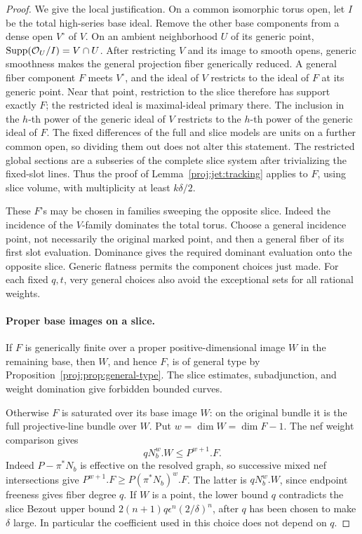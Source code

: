 \begin{proof}
We give the local justification.  On a common isomorphic torus
open, let \(I\) be the total high-series base ideal.  Remove the
other base components from a dense open \(V^\circ\) of \(V\).
On an ambient neighborhood \(U\) of its generic point,
\(\operatorname{Supp}(\mathcal{O}_U/I)=V\cap U\).
After restricting \(V\) and its image to smooth opens, generic
smoothness makes the general projection fiber generically reduced.
A general fiber component \(F\) meets \(V^\circ\), and the ideal
of \(V\) restricts to the ideal of \(F\) at its generic point.
Near that point,
restriction to the slice therefore has support exactly \(F\);
the restricted ideal is maximal-ideal primary there.  The inclusion
in the \(h\)-th power of the generic ideal of \(V\) restricts to
the \(h\)-th power of the generic ideal of \(F\).
The fixed differences of the full and slice models are units on
a further common open, so dividing them out does not alter this
statement.  The restricted global sections are a subseries of
the complete slice system after trivializing the fixed-slot lines.
Thus the proof of Lemma~\ref{proj:jet:tracking} applies to \(F\), using
slice volume, with multiplicity at least \(k\delta/2\).

These \(F\)'s may be chosen in families sweeping the opposite
slice.  Indeed the incidence of the \(V\)-family dominates the
total torus.  Choose a general incidence point, not necessarily
the original marked point, and then a general fiber of its first
slot evaluation.  Dominance gives the required dominant evaluation
onto the opposite slice.  Generic flatness permits the component
choices just made.  For each fixed \(q,t\), very general choices
also avoid the exceptional sets for all rational weights.

\paragraph{Proper base images on a slice.}
If \(F\) is generically finite over a proper positive-dimensional
image \(W\) in the remaining base, then \(W\), and hence \(F\), is
of general type by Proposition~\ref{proj:prop:general-type}.
The slice estimates, subadjunction, and weight domination give
forbidden bounded curves.

Otherwise \(F\) is saturated over its base image \(W\): on the
original bundle it is the full projective-line bundle over \(W\).
Put \(w=\dim W=\dim F-1\).  The nef weight comparison gives
\begin{equation}\label{proj:jet:saturated-degree}
 qN_b^w.W\le P^{w+1}.F.
\end{equation}
Indeed \(P-\pi^*N_b\) is effective on the resolved graph, so
successive mixed nef intersections give
\(P^{w+1}.F\ge P(\pi^*N_b)^w.F\).  The latter is
\(qN_b^w.W\), since endpoint freeness gives fiber degree \(q\).
If \(W\) is a point, the lower bound \(q\) contradicts the slice
Bezout upper bound \(2(n+1)q\epsilon^n(2/\delta)^n\), after \(q\)
has been chosen to make \(\delta\) large.  In particular the
coefficient used in this choice does not depend on \(q\).


\end{proof}
